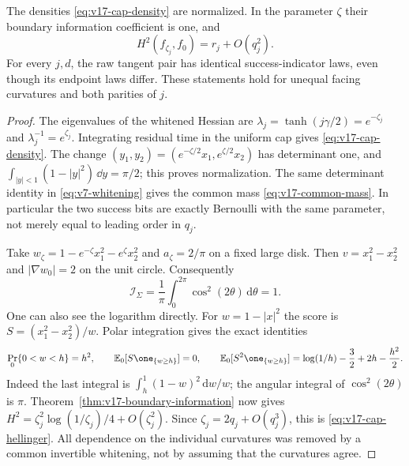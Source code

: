 \begin{lemma}
\label{lem:v17-cap-information}
The densities \eqref{eq:v17-cap-density} are normalized. In the
parameter $\zeta$ their boundary information coefficient is one, and
\begin{equation}\label{eq:v17-cap-hellinger}
 H^2(f_{\zeta_j},f_0)=r_j+O(q_j^2).
\end{equation}
For every $j,d$, the raw tangent pair has identical success-indicator
laws, even though its endpoint laws differ. These statements hold for
unequal facing curvatures and both parities of $j$.
\end{lemma}
\begin{proof}
The eigenvalues of the whitened Hessian are
$\lambda_j=\tanh(j\gamma/2)=e^{-\zeta_j}$ and
$\lambda_j^{-1}=e^{\zeta_j}$. Integrating residual time in the
uniform cap gives \eqref{eq:v17-cap-density}. The change
$(y_1,y_2)=(e^{-\zeta/2}x_1,e^{\zeta/2}x_2)$ has determinant one,
and $\int_{|y|<1}(1-|y|^2)\,\dd y=\pi/2$; this proves
normalization. The same determinant identity in
\eqref{eq:v7-whitening} gives the common mass
\eqref{eq:v17-common-mass}. In particular the two success bits are
exactly Bernoulli with the same parameter, not merely equal to leading
order in $q_j$.

Take $w_\zeta=1-e^{-\zeta}x_1^2-e^\zeta x_2^2$ and $a_\zeta=2/\pi$
on a fixed large disk. Then $v=x_1^2-x_2^2$ and
$|\nabla w_0|=2$ on the unit circle. Consequently
\[
 \mathcal I_\Sigma=
       \frac1\pi\int_0^{2\pi}\cos^2(2\theta)\,\mathrm d\theta=1.
\]
One can also see the logarithm directly. For $w=1-|x|^2$ the score is
$S=(x_1^2-x_2^2)/w$. Polar integration gives the exact identities
\begin{equation}\label{eq:v17-cap-score}
 \Pr_0\{0<w<h\}=h^2,\qquad
 \mathbb E_0[S\one_{\{w\ge h\}}]=0,\qquad
 \mathbb E_0[S^2\one_{\{w\ge h\}}]
        =\log(1/h)-\frac32+2h-\frac{h^2}{2}.
\end{equation}
Indeed the last integral is $\int_h^1(1-w)^2\,\mathrm dw/w$;
the angular integral of $\cos^2(2\theta)$ is $\pi$.
Theorem~\ref{thm:v17-boundary-information} now gives
$H^2=\zeta_j^2\log(1/\zeta_j)/4+O(\zeta_j^2)$.
Since $\zeta_j=2q_j+O(q_j^3)$, this is
\eqref{eq:v17-cap-hellinger}. All dependence on the individual
curvatures was removed by a common invertible whitening, not by assuming
that the curvatures agree.
\end{proof}

